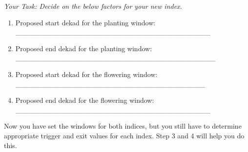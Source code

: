 \documentclass[letterpaper,10pt,english]{sphinxmanual}
\begin{document}
\emph{Your Task: Decide on the below factors for your new index.}
\begin{enumerate}
\item {} 
Proposed start dekad for the planting window: \_\_\_\_\_\_\_\_\_\_\_\_\_\_\_\_\_\_\_\_\_\_\_\_\_\_\_\_\_\_\_\_\_\_\_\_\_\_

\item {} 
Proposed end dekad for the planting window: \_\_\_\_\_\_\_\_\_\_\_\_\_\_\_\_\_\_\_\_\_\_\_\_\_\_\_\_\_\_\_\_\_\_\_\_\_\_\_

\item {} 
Proposed start dekad for the flowering window: \_\_\_\_\_\_\_\_\_\_\_\_\_\_\_\_\_\_\_\_\_\_\_\_\_\_\_\_\_\_\_\_\_\_\_\_\_

\item {} 
Proposed end dekad for the flowering window: \_\_\_\_\_\_\_\_\_\_\_\_\_\_\_\_\_\_\_\_\_\_\_\_\_\_\_\_\_\_\_\_\_\_\_\_\_\_

\end{enumerate}

Now you have set the windows for both indices, but you still have to determine appropriate trigger and exit values for each index. Step 3 and 4 will help you do this.
\end{document}
